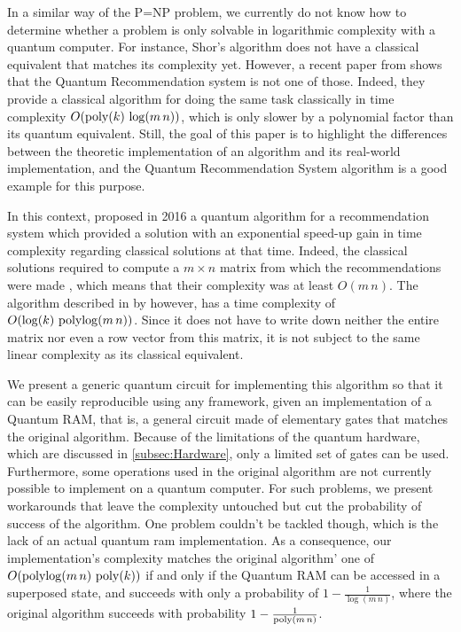 \documentclass[11pt, a4paper]{article}
\begin{document}
        In a similar way of the P=NP problem, we currently do not know how to determine whether a problem is only solvable in logarithmic complexity with a quantum computer. For instance, Shor's algorithm \cite{Shor} does not have a classical equivalent that matches its complexity yet. However, a recent paper from \citeauthor{Dequantized} shows that the Quantum Recommendation system is not one of those. Indeed, they provide a classical algorithm for doing the same task classically in time complexity \(O(\operatorname{poly}(k)\,\log(m\,n))\), which is only slower by a polynomial factor than its quantum equivalent. Still, the goal of this paper is to highlight the differences between the theoretic implementation of an algorithm and its real-world implementation, and the Quantum Recommendation System algorithm is a good example for this purpose.
        
        In this context, \citeauthor{QRS} proposed in 2016 a quantum algorithm for a recommendation system which provided a solution with an exponential speed-up gain in time complexity regarding classical solutions at that time. Indeed, the classical solutions required to compute a \(m\times n\) matrix from which the recommendations were made \cite{Amazon}, which means that their complexity was at least \(O(m\,n)\). The algorithm described in \cite{QRS} by \citeauthor{QRS} however, has a time complexity of \(O(\log(k)\,\operatorname{polylog}(m\,n))\). Since it does not have to write down neither the entire matrix nor even a row vector from this matrix, it is not subject to the same linear complexity as its classical equivalent.
        
        We present a generic quantum circuit for implementing this algorithm so that it can be easily reproducible using any framework, given an implementation of a Quantum RAM, that is, a general circuit made of elementary gates that matches the original algorithm. Because of the limitations of the quantum hardware, which are discussed in \autoref{subsec:Hardware}, only a limited set of gates can be used. Furthermore, some operations used in the original algorithm are not currently possible to implement on a quantum computer. For such problems, we present workarounds that leave the complexity untouched but cut the probability of success of the algorithm. One problem couldn't be tackled though, which is the lack of an actual quantum ram implementation. As a consequence, our implementation's complexity matches the original algorithm' one of \(O(\operatorname{polylog}(m\,n)\,\operatorname{poly}(k))\) if and only if the Quantum RAM can be accessed in a superposed state, and succeeds with only a probability of \(1-\frac{1}{\log(m\,n)}\), where the original algorithm succeeds with probability \(1 - \frac{1}{\operatorname{poly}(m\,n)}\).
        
\end{document}

